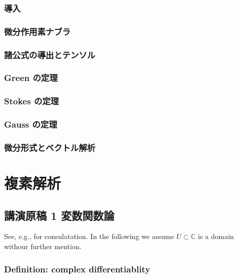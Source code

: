 \documentclass[openany, a4paper, oneside]{book}
\theoremstyle{break}
\theoremstyle{breakdefn}
\newcommand{\bbC}{\mathbb{C}}
\begin{document}
\section{導入}
\label{sec-5-3-1}
\section{微分作用素ナブラ}
\label{sec-5-3-2}
\section{諸公式の導出とテンソル}
\label{sec-5-3-3}
\section{Green の定理}
\label{sec-5-3-4}
\section{Stokes の定理}
\label{sec-5-3-5}
\section{Gauss の定理}
\label{sec-5-3-6}
\section{微分形式とベクトル解析}
\label{sec-5-3-7}
\part{複素解析}
\label{sec-6}
\chapter{講演原稿 1 変数関数論}
\label{sec-6-1}

See, e.g., \cite{MitsuoSugiura2} for consulatation.
In the following we assume $U \subset \bbC$ is a domain withour further mention.
\section{Definition: complex differentiablity}
\label{sec-6-1-1}
\end{document}
